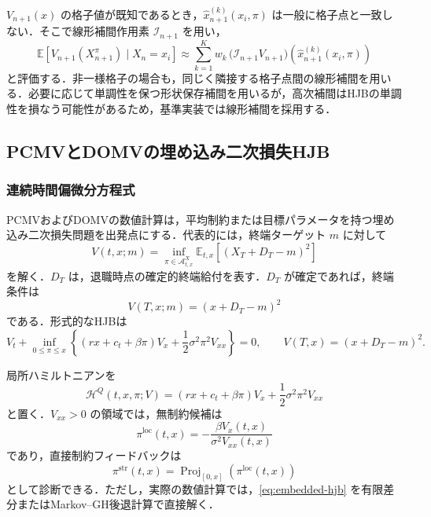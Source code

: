 \documentclass[10pt,a4paper]{article}
\theoremstyle{plain}
\theoremstyle{definition}
\newcommand{\E}{\mathbb{E}}
\DeclareMathOperator{\Proj}{Proj}
\newcommand{\A}{\mathcal{A}}
\newcommand{\Hamil}{\mathcal{H}}
\begin{document}
$V_{n+1}(x)$ の格子値が既知であるとき，$\widehat{x}_{n+1}^{(k)}(x_i,\pi)$ は一般に格子点と一致しない．そこで線形補間作用素 $\mathcal I_{n+1}$ を用い，
\begin{equation}
  \E\left[V_{n+1}(X_{n+1}^{\pi})\mid X_n=x_i\right]
  \approx
  \sum_{k=1}^K w_k\,
  \bigl(\mathcal I_{n+1}V_{n+1}\bigr)
  \left(\widehat{x}_{n+1}^{(k)}(x_i,\pi)\right)
  \label{eq:gh-expectation}
\end{equation}
と評価する．非一様格子の場合も，同じく隣接する格子点間の線形補間を用いる．必要に応じて単調性を保つ形状保存補間を用いるが，高次補間はHJBの単調性を損なう可能性があるため，基準実装では線形補間を採用する．

\subsection{PCMVとDOMVの埋め込み二次損失HJB}
\label{sec:embedded}

\subsubsection{連続時間偏微分方程式}

PCMVおよびDOMVの数値計算は，平均制約または目標パラメータを持つ埋め込み二次損失問題を出発点にする．代表的には，終端ターゲット $m$ に対して
\begin{equation}
  V(t,x;m)=\inf_{\pi\in\A^X_{t,x}}
  \E_{t,x}\left[(X_T+D_T-m)^2\right]
  \label{eq:embedded-value}
\end{equation}
を解く．$D_T$ は，退職時点の確定的終端給付を表す．$D_T$ が確定であれば，終端条件は
\begin{equation}
  V(T,x;m)=(x+D_T-m)^2
  \label{eq:embedded-terminal}
\end{equation}
である．形式的なHJBは
\begin{equation}
  V_t+
  \inf_{0\leq\pi\leq x}
  \left\{
    (rx+c_t+\beta\pi)V_x
    +\frac{1}{2}\sigma^2\pi^2 V_{xx}
  \right\}=0,
  \qquad
  V(T,x)=(x+D_T-m)^2.
  \label{eq:embedded-hjb}
\end{equation}

局所ハミルトニアンを
\begin{equation}
  \Hamil^Q(t,x,\pi;V)
  =(rx+c_t+\beta\pi)V_x
  +\frac{1}{2}\sigma^2\pi^2 V_{xx}
  \label{eq:quadratic-ham}
\end{equation}
と置く．$V_{xx}>0$ の領域では，無制約候補は
\begin{equation}
  \pi^{\mathrm{loc}}(t,x)
  =-\frac{\beta V_x(t,x)}{\sigma^2 V_{xx}(t,x)}
  \label{eq:loc-pi-quadratic}
\end{equation}
であり，直接制約フィードバックは
\begin{equation}
  \pi^{\mathrm{str}}(t,x)
  =\Proj_{[0,x]}\left(\pi^{\mathrm{loc}}(t,x)\right)
  \label{eq:proj-quadratic}
\end{equation}
として診断できる．ただし，実際の数値計算では，\eqref{eq:embedded-hjb} を有限差分またはMarkov--GH後退計算で直接解く．
\end{document}

